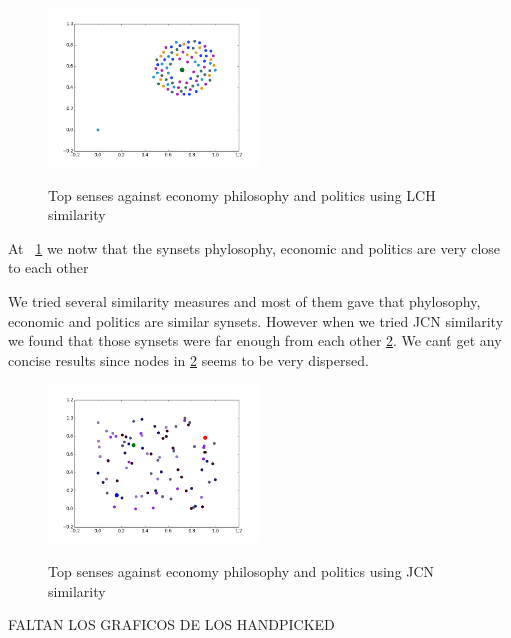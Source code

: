 \begin{figure}[h!]
    \caption{Top senses against economy philosophy and politics using LCH similarity}
    \centering
    \includegraphics[width=0.5\textwidth]{phyl_eco_pol_lch_sim_graph.png}
    \label{fig:phyl_eco_pol_lch_sim_graph}
\end{figure}

At ~\ref{fig:phyl_eco_pol_lch_sim_graph} we notw that the synsets phylosophy, economic and politics are very close to each other

We tried several similarity measures and most of them gave that phylosophy, economic and politics are similar synsets.
However when we tried JCN similarity we found that those synsets were far enough from each other \ref{fig:phyl_eco_pol_jcn_sim_graph}. We can\'t get any concise results since nodes in \ref{fig:phyl_eco_pol_jcn_sim_graph} seems to be very dispersed.

\begin{figure}[h!]
    \caption{Top senses against economy philosophy and politics using JCN similarity}
    \centering
    \includegraphics[width=0.5\textwidth]{phyl_eco_pol_jcn_sim_graph.png}
    \label{fig:phyl_eco_pol_jcn_sim_graph}
\end{figure}

FALTAN LOS GRAFICOS DE LOS HANDPICKED
